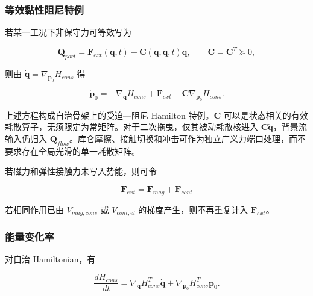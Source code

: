 \subsubsection{等效黏性阻尼特例}\label{sec:hamiltonian-3-4-2}

若某一工况下非保守力可等效写为

\begin{equation}
\label{eq:hamiltonian-3-33}
\mathbf{Q}_{port} = \mathbf{F}_{ext}\left( \mathbf{q},t \right) - \mathbf{C}\left( \mathbf{q},\dot{\mathbf{q}},t \right)\dot{\mathbf{q}},\quad\quad\mathbf{C} = \mathbf{C}^{T} \succcurlyeq 0,
\end{equation}

则由 \(\dot{\mathbf{q}} = \nabla_{\mathbf{p}_{0}}H_{cons}\) 得

\begin{equation}
\label{eq:hamiltonian-3-34}
\boxed{{\dot{\mathbf{p}}}_{0} = - \nabla_{\mathbf{q}}H_{cons} + \mathbf{F}_{ext} - \mathbf{C}\nabla_{\mathbf{p}_{0}}H_{cons}.}
\end{equation}

上述方程构成自治骨架上的受迫---阻尼 Hamilton 特例。\(\mathbf{C}\) 可以是状态相关的有效耗散算子，无须限定为常矩阵。对于二次拖曳，仅其被动耗散核进入 \(\mathbf{C}\dot{\mathbf{q}}\)，背景流输入仍归入 \(\mathbf{Q}_{flow}\)。库仑摩擦、接触切换和冲击可作为独立广义力端口处理，而不要求存在全局光滑的单一耗散矩阵。

若磁力和弹性接触力未写入势能，则可令

\begin{equation}
\label{eq:hamiltonian-3-35}
\mathbf{F}_{ext} = \mathbf{F}_{mag} + \mathbf{F}_{cont}
\end{equation}

若相同作用已由 \(V_{mag,cons}\) 或 \(V_{cont,el}\) 的梯度产生，则不再重复计入 \(\mathbf{F}_{ext}\)。

\subsubsection{能量变化率}\label{sec:hamiltonian-3-4-3}

对自治 Hamiltonian，有\cite{MarsdenRatiu1999MechanicsSymmetry,Zhong2020Dissipative,Desai2021PHNN}

\begin{equation}
\label{eq:hamiltonian-3-36}
\frac{dH_{cons}}{dt} = \nabla_{\mathbf{q}}H_{cons}^{T}\dot{\mathbf{q}} + \nabla_{\mathbf{p}_{0}}H_{cons}^{T}{\dot{\mathbf{p}}}_{0}.
\end{equation}

